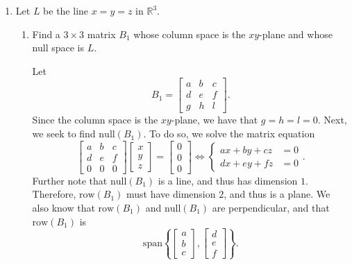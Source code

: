 \documentclass[letter]{article}
\newcommand{\R}{\mathbb{R}}
\newcommand{\Span}{\mathrm{span}}
\newcommand{\Null}{\mathrm{null}}
\newcommand{\Row}{\mathrm{row}}
\newcommand{\mat}[1]{\begin{bmatrix}#1\end{bmatrix}}
\newenvironment{answer}{
	\begin{adjustwidth}{8mm}{} \vspace{2mm}}{\end{adjustwidth} \vspace{2mm}
}
\theoremstyle{plain}
\theoremstyle{definition}
\theoremstyle{remark}
\begin{document}
\begin{enumerate}
\begin{enumerate}
\begin{answer}
\[				\]
			\end{answer}
			\item Find the dot product of each of your basis vectors for $\mathcal{R}$ with each of your basis vectors for $\mathcal{N}$.
			What can you say geometrically about $\mathcal{R}$ and $\mathcal{N}$?
			\begin{answer}
				Observe that $[1,0,1,1,3] \cdot [-1,-1,1,0,0] = -1 + 0 + 1+ 0 + 0 = 0$. Similarly, the dot products of each other basis vector of $\mathcal{R}$ dotted with each other basis vector for $\mathcal{N}$ are all $0$. Hence, $\mathcal{R}$ and $\mathcal{N}$ are perpendicular. 
			\end{answer}
		\end{enumerate}
		
		\item Let $L$ be the line $x=y=z$ in $\R^3$.
		\begin{enumerate}
			\item Find a $3\times 3$ matrix $B_1$ whose column space is the $xy$-plane and whose null space is $L$.
			\begin{answer}
				Let
				\[
				B_1 = \left[\begin{array}{ccc}
							a & b & c \\
							d & e & f \\
							g & h & l
						\end{array}\right].
				\]
				Since the column space is the $xy$-plane, we have that $g=h=l=0$. Next, we seek to find $\Null(B_1)$. To do so, we solve the matrix equation
				\[
				\left[\begin{array}{ccc}
					a & b & c \\
					d & e & f \\
					0 & 0 & 0
				\end{array}\right] \mat{x\\y\\z} = \mat{0\\0\\0} \iff
				\begin{cases}
					ax+by+cz &= 0 \\
					dx+ey+fz &= 0 
				\end{cases}. 
				\]
				Further note that $\Null(B_1)$ is a line, and thus has dimension $1$. Therefore, $\Row(B_1)$ must have dimension $2$, and thus is a plane. We also know that $\Row(B_1)$ and $\Null(B_1)$ are perpendicular, and that $\Row(B_1)$ is 
				\[
				\Span \left\{\mat{a\\b\\c}, \mat{d\\e\\f}\right\}.
\]
\end{answer}
\end{enumerate}
\end{enumerate}
\end{document}
